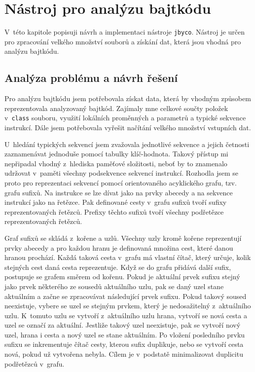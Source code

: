 \chapter{Nástroj pro analýzu bajtkódu}\label{Tool}

V~této kapitole popisuji návrh a implementaci nástroje \texttt{jbyco}. Nástroj je určen pro zpracování velkého množství souborů a získání dat, která jsou vhodná pro analýzu bajtkódu.

\section{Analýza problému a návrh řešení}\label{ToolDesign}

Pro analýzu bajtkódu jsem potřebovala získat data, která by vhodným způsobem reprezentovala analyzovaný bajtkód. Zajímaly mne celkové součty položek v~\texttt{class} souboru, využití lokálních proměnných a parametrů a typické sekvence instrukcí. Dále jsem potřebovala vyřešit načítání velkého množství vstupních dat.

U~hledání typických sekvencí jsem zvažovala jednotlivé sekvence a jejich četnosti zaznamenávat jednoduše pomocí tabulky klíč-hodnota. Takový přístup mi nepřipadal vhodný z~hlediska paměťové složitosti, neboť by to znamenalo udržovat v~paměti všechny podsekvence sekvencí instrukcí. Rozhodla jsem se proto pro reprezentaci sekvencí pomocí orientovaného acyklického grafu, tzv. grafu sufixů. Na instrukce se lze dívat jako na prvky abecedy a na sekvence instrukcí jako na řetězce. Pak definované cesty v~grafu sufixů tvoří sufixy reprezentovaných řetězců. Prefixy těchto sufixů tvoří všechny podřetězce reprezentovaných řetězců. 

Graf sufixů se skládá z~kořene a uzlů. Všechny uzly kromě kořene reprezentují prvky abecedy a pro každou hranu je definovaná množina cest, které danou hranou prochází. Každá taková cesta v~grafu má vlastní čítač, který určuje, kolik stejných cest daná cesta reprezentuje. Když se do grafu přidává další sufix, postupuje se grafem směrem od kořenu. Pokud je aktuální prvek sufixu stejný jako prvek některého ze sousedů aktuálního uzlu, pak se daný uzel stane aktuálním a začne se zpracovávat následující prvek sufixu. Pokud takový soused neexistuje, vybere se uzel se stejným prvkem, který je nedosažitelný z~aktuálního uzlu. K~tomuto uzlu se vytvoří z~aktuálního uzlu hrana, vytvoří se nová cesta a uzel se označí za aktuální. Jestliže takový uzel neexistuje, pak se vytvoří nový uzel, hrana i cesta a nový uzel se stane aktuálním. Po vložení posledního prvku sufixu se inkrementuje čítač cesty, kterou sufix duplikuje, nebo se vytvoří cesta nová, pokud už vytvořena nebyla. Cílem je v~podstatě minimalizovat duplicitu podřetězců v~grafu.

